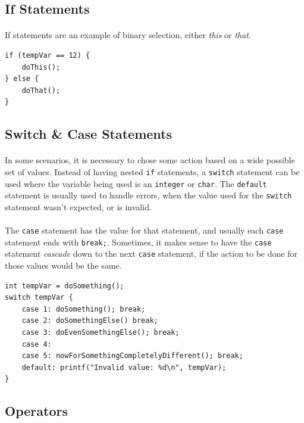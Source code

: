 \documentclass[letter,11pt]{article}
\begin{document}
\subsection{If Statements}
\paragraph{}If statements are an example of binary selection, either \textit{this} or \textit{that}.
\begin{verbatim}
if (tempVar == 12) {
    doThis();
} else {
    doThat();
}
\end{verbatim}

\subsection{Switch \& Case Statements}\label{sec:switchcase}
\paragraph{}In some scenarios, it is necessary to chose some action based on a wide possible set of values. Instead of having nested \texttt{if} statements, a \texttt{switch} statement can be used where the variable being used is an \texttt{integer} or \texttt{char}. The \texttt{default} statement is usually used to handle errors, when the value used for the \texttt{switch} statement wasn't expected, or is invalid.

\paragraph{}The \texttt{case} statement has the value for that statement, and usually each \texttt{case} statement ends with \texttt{break;}. Sometimes, it makes sense to have the \texttt{case} statement \textit{cascade} down to the next \texttt{case} statement, if the action to be done for those values would be the same.

\begin{verbatim}
int tempVar = doSomething();
switch tempVar {
    case 1: doSomething(); break;
    case 2: doSomethingElse() break;
    case 3: doEvenSomethingElse(); break;
    case 4:
    case 5: nowForSomethingCompletelyDifferent(); break;
    default: printf("Invalid value: %d\n", tempVar);
}
\end{verbatim}

\subsection{Operators}
\end{document}
